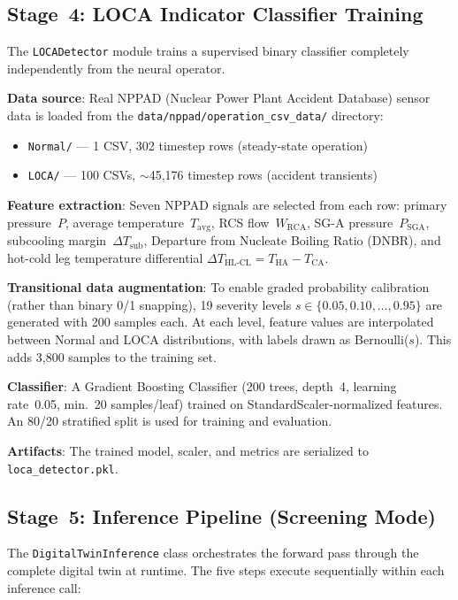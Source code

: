 \documentclass[journal]{IEEEtran}
\begin{document}
\subsection{Stage~4: LOCA Indicator Classifier Training}

The \texttt{LOCADetector} module trains a supervised binary classifier completely independently from the neural operator.

\textbf{Data source}: Real NPPAD (Nuclear Power Plant Accident Database) sensor data is loaded from the \texttt{data/nppad/operation\_csv\_data/} directory:
\begin{itemize}
    \item \texttt{Normal/} --- 1 CSV, 302 timestep rows (steady-state operation)
    \item \texttt{LOCA/} --- 100 CSVs, $\sim$45,176 timestep rows (accident transients)
\end{itemize}

\textbf{Feature extraction}: Seven NPPAD signals are selected from each row: primary pressure~$P$, average temperature~$T_\text{avg}$, RCS flow~$W_\text{RCA}$, SG-A pressure~$P_\text{SGA}$, subcooling margin~$\Delta T_\text{sub}$, Departure from Nucleate Boiling Ratio (DNBR), and hot-cold leg temperature differential $\Delta T_\text{HL-CL} = T_\text{HA} - T_\text{CA}$.

\textbf{Transitional data augmentation}: To enable graded probability calibration (rather than binary 0/1 snapping), 19 severity levels $s \in \{0.05, 0.10, \ldots, 0.95\}$ are generated with 200 samples each. At each level, feature values are interpolated between Normal and LOCA distributions, with labels drawn as Bernoulli($s$). This adds 3,800 samples to the training set.

\textbf{Classifier}: A Gradient Boosting Classifier (200 trees, depth~4, learning rate~0.05, min.\ 20 samples/leaf) trained on StandardScaler-normalized features. An 80/20 stratified split is used for training and evaluation.

\textbf{Artifacts}: The trained model, scaler, and metrics are serialized to \texttt{loca\_detector.pkl}.

\subsection{Stage~5: Inference Pipeline (Screening Mode)}
\label{sec:inference_pipeline}

The \texttt{DigitalTwinInference} class orchestrates the forward pass through the complete digital twin at runtime. The five steps execute sequentially within each inference call:
\end{document}
